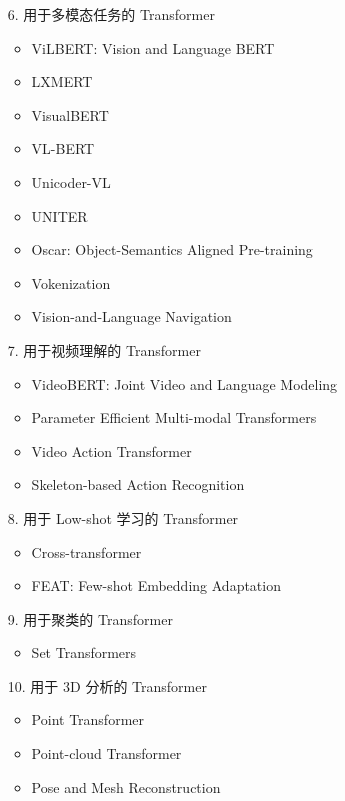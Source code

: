 \begin{itemize}
\item [6.] 用于多模态任务的 Transformer

\begin{itemize}
\item ViLBERT: Vision and Language BERT
\item LXMERT
\item VisualBERT
\item VL-BERT
\item Unicoder-VL
\item UNITER
\item Oscar: Object-Semantics Aligned Pre-training
\item Vokenization
\item Vision-and-Language Navigation
\end{itemize}


\item [7.] 用于视频理解的 Transformer

\begin{itemize}
\item VideoBERT: Joint Video and Language Modeling
\item Parameter Efficient Multi-modal Transformers
\item Video Action Transformer
\item Skeleton-based Action Recognition
\end{itemize}


\item [8.] 用于 Low-shot 学习的 Transformer

\begin{itemize}
\item Cross-transformer
\item FEAT: Few-shot Embedding Adaptation
\end{itemize}


\item [9.] 用于聚类的 Transformer
 
\begin{itemize}
\item Set Transformers 
\end{itemize}


\item [10.] 用于 3D 分析的 Transformer
 
\begin{itemize}
\item Point Transformer
\item Point-cloud Transformer
\item Pose and Mesh Reconstruction
\end{itemize}

\end{itemize}

